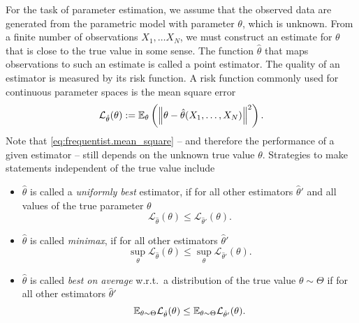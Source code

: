 For the task of parameter estimation, we assume that the observed data are generated from the parametric model with  parameter $\theta$, which is unknown.
From a finite number of observations $X_1, \ldots X_N$, we must construct an estimate for $\theta$ that is close to the true value in some sense.
The function $\hat\theta$ that maps observations to such an estimate is called a point estimator.
The quality of an estimator is measured by its risk function.
A risk function commonly used for continuous parameter spaces is the mean square error
\[
  \label{eq:frequentist.mean_square}
  \mathcal{L}_{\hat\theta}(\theta) := \mathbb{E}_\theta \left( {\left\Vert\theta - \hat\theta(X_1, \ldots, X_N)\right\Vert}^2 \right).
\]
Note that \cref{eq:frequentist.mean_square} -- and therefore the performance of a given estimator -- still depends on the unknown true value $\theta$.
Strategies to make statements independent of the true value include 
\begin{itemize}
  \item $\hat\theta$ is called a \emph{uniformly best} estimator, if for all other estimators $\hat\theta'$ and all values of the true parameter $\theta$
  \[
    \mathcal{L}_{\hat\theta}(\theta) \le \mathcal{L}_{\hat\theta'}(\theta).
  \]

  \item $\hat\theta$ is called \emph{minimax}, if for all other estimators $\hat\theta'$
  \[
    \sup_\theta \mathcal{L}_{\hat\theta}(\theta) \le \sup_\theta \mathcal{L}_{\hat\theta'}(\theta).
  \]

  \item $\hat\theta$ is called \emph{best on average} w.r.t.\ a distribution of the true value $\theta \sim \Theta$ if for all other estimators $\hat\theta'$
  \[
    \mathbb{E}_{\theta \sim \Theta} \mathcal{L}_{\hat\theta}(\theta) \le  \mathbb{E}_{\theta \sim \Theta} \mathcal{L}_{\hat\theta'}(\theta).
  \]
\end{itemize}















